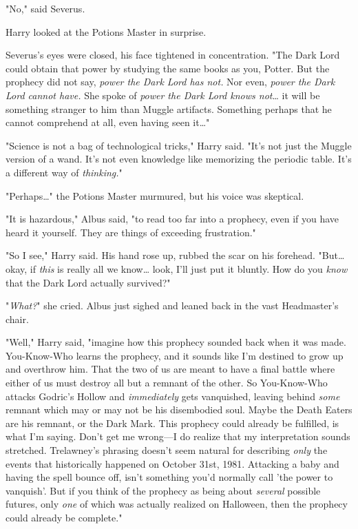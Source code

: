 "No," said Severus.

Harry looked at the Potions Master in surprise.

Severus's eyes were closed, his face tightened in concentration. "The Dark Lord could obtain that power by studying the same books as you, Potter. But the prophecy did not say, \emph{power the Dark Lord has not.} Nor even, \emph{power the Dark Lord cannot have.} She spoke of \emph{power the Dark Lord knows not}{\ldots} it will be something stranger to him than Muggle artifacts. Something perhaps that he cannot comprehend at all, even having seen it{\ldots}"

"Science is not a bag of technological tricks," Harry said. "It's not just the Muggle version of a wand. It's not even knowledge like memorizing the periodic table. It's a different way of \emph{thinking.}"

"Perhaps{\ldots}" the Potions Master murmured, but his voice was skeptical.

"It is hazardous," Albus said, "to read too far into a prophecy, even if you have heard it yourself. They are things of exceeding frustration."

"So I see," Harry said. His hand rose up, rubbed the scar on his forehead. "But{\ldots} okay, if \emph{this} is really all we know{\ldots} look, I'll just put it bluntly. How do you \emph{know} that the Dark Lord actually survived?"

"\emph{What?}" she cried. Albus just sighed and leaned back in the vast Headmaster's chair.

"Well," Harry said, "imagine how this prophecy sounded back when it was made. You-Know-Who learns the prophecy, and it sounds like I'm destined to grow up and overthrow him. That the two of us are meant to have a final battle where either of us must destroy all but a remnant of the other. So You-Know-Who attacks Godric's Hollow and \emph{immediately} gets vanquished, leaving behind \emph{some} remnant which may or may not be his disembodied soul. Maybe the Death Eaters are his remnant, or the Dark Mark. This prophecy could already be fulfilled, is what I'm saying. Don't get me wrong---I do realize that my interpretation sounds stretched. Trelawney's phrasing doesn't seem natural for describing \emph{only} the events that historically happened on October 31st, 1981. Attacking a baby and having the spell bounce off, isn't something you'd normally call 'the power to vanquish'. But if you think of the prophecy as being about \emph{several} possible futures, only \emph{one} of which was actually realized on Halloween, then the prophecy could already be complete."

